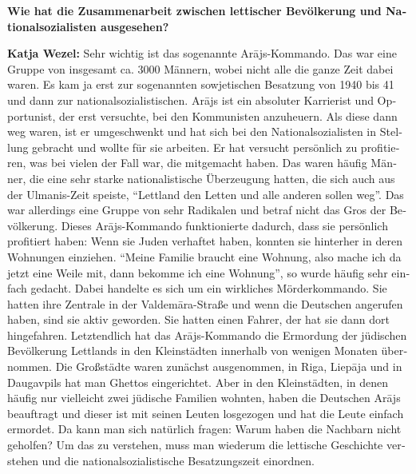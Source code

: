 \begin{otherlanguage}{ngerman}
\textbf{Wie hat die Zusammenarbeit zwischen lettischer Bevölkerung und Nationalsozialisten ausgesehen?} 

\textbf{Katja Wezel:} Sehr wichtig ist das sogenannte Arājs-Kommando. Das war eine Gruppe von insgesamt ca. 3000 Männern, wobei nicht alle die ganze Zeit dabei waren. Es kam ja erst zur sogenannten sowjetischen Besatzung von 1940 bis 41 und dann zur nationalsozialistischen. Arājs ist ein absoluter Karrierist und Opportunist, der erst versuchte, bei den Kommunisten anzuheuern. Als diese dann weg waren, ist er umgeschwenkt und hat sich bei den Nationalsozialisten in Stellung gebracht und wollte für sie arbeiten. Er hat versucht persönlich zu profitieren, was bei vielen der Fall war, die mitgemacht haben. Das waren häufig Männer, die eine sehr starke nationalistische Überzeugung hatten, die sich auch aus der Ulmanis-Zeit speiste, ``Lettland den Letten und alle anderen sollen weg''. Das war allerdings eine Gruppe von sehr Radikalen und betraf nicht das Gros der Bevölkerung. Dieses Arājs-Kommando funktionierte dadurch, dass sie persönlich profitiert haben: Wenn sie Juden verhaftet haben, konnten sie hinterher in deren Wohnungen einziehen. ``Meine Familie braucht eine Wohnung, also mache ich da jetzt eine Weile mit, dann bekomme ich eine Wohnung'', so wurde häufig sehr einfach gedacht. Dabei handelte es sich um ein wirkliches Mörderkommando. Sie hatten ihre Zentrale in der Valdemāra-Straße und wenn die Deutschen angerufen haben, sind sie aktiv geworden. Sie hatten einen Fahrer, der hat sie dann dort hingefahren. Letztendlich hat das Arājs-Kommando die Ermordung der jüdischen Bevölkerung Lettlands in den Kleinstädten innerhalb von wenigen Monaten übernommen. Die Großstädte waren zunächst ausgenommen, in Riga, Liepāja und in Daugavpils hat man Ghettos eingerichtet. Aber in den Kleinstädten, in denen häufig nur vielleicht zwei jüdische Familien wohnten, haben die Deutschen Arājs beauftragt und dieser ist mit seinen Leuten losgezogen und hat die Leute einfach ermordet. Da kann man sich natürlich fragen: Warum haben die Nachbarn nicht geholfen? Um das zu verstehen, muss man wiederum die lettische Geschichte verstehen und die nationalsozialistische Besatzungszeit einordnen.\\

\end{otherlanguage}
